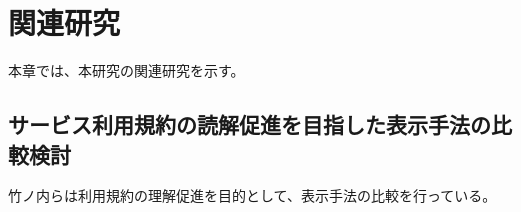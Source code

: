 \chapter{関連研究}
\label{related}

本章では、本研究の関連研究を示す。

\section{サービス利用規約の読解促進を目指した表示手法の比較検討}
竹ノ内らは\cites{竹ノ内2020}利用規約の理解促進を目的として、表示手法の比較を行っている。